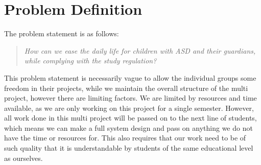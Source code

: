 \section{Problem Definition}
\label{sec:pdef}
The problem statement is as follows:

\begin{quotation}
\textit{How can we ease the daily life for children with ASD and their guardians, while complying with the study regulation?}
\end{quotation}

This problem statement is necessarily vague to allow the individual groups some freedom in their projects, while we maintain the overall structure of the multi project, however there are limiting factors.
We are limited by resources and time available, as we are only working on this project for a single semester. 
However, all work done in this multi project will be passed on to the next line of students, which means we can make a full system design and pass on anything we do not have the time or resources for.
This also requires that our work need to be of such quality that it is understandable by students of the same educational level as ourselves.




  



